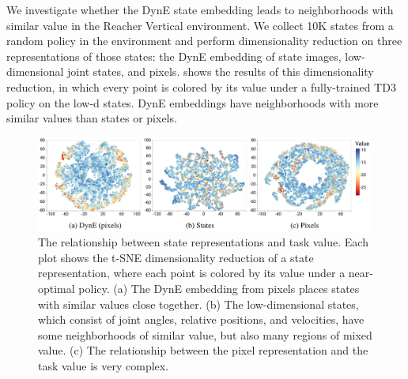 We investigate whether the DynE state embedding leads to neighborhoods with similar value in the Reacher Vertical environment.
We collect 10K states from a random policy in the environment and perform dimensionality reduction on three representations of those states: the DynE embedding of state images, low-dimensional joint states, and pixels.
 shows the results of this dimensionality reduction, in which every point is colored by its value under a fully-trained TD3 policy on the low-d states.
DynE embeddings have neighborhoods with more similar values than states or pixels.

\begin{figure}[h]
\vspace{-0.5em}
\centering
    \includegraphics[width=0.99\textwidth]{figures/dyne/state_tsne.png}
\caption{The relationship between state representations and task value. Each plot shows the t-SNE dimensionality reduction of a state representation, where each point is colored by its value under a near-optimal policy.
(a) The DynE embedding from pixels places states with similar values close together.
(b) The low-dimensional states, which consist of joint angles, relative positions, and velocities, have some neighborhoods of similar value, but also many regions of mixed value.
(c) The relationship between the pixel representation and the task value is very complex.
}
\label{fig:state_tsne}
\end{figure}


